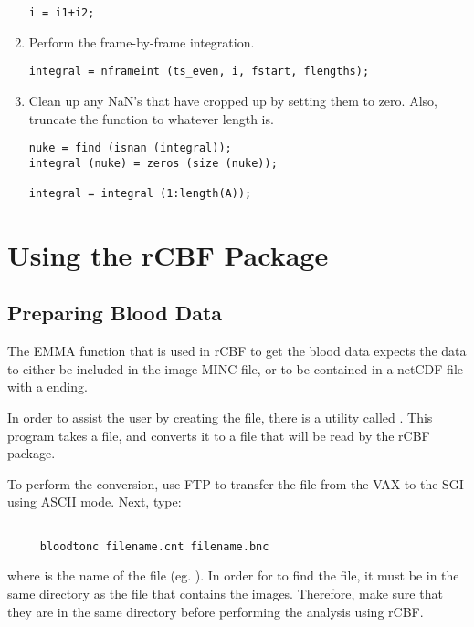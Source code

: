 \begin{enumerate}
\begin{verbatim}
i = i1+i2;
\end{verbatim}

\item Perform the frame-by-frame integration.
\begin{verbatim}
integral = nframeint (ts_even, i, fstart, flengths);
\end{verbatim}

\item Clean up any NaN's that have cropped up by setting them to zero.
Also, truncate the function to whatever length  is.
\begin{verbatim}
nuke = find (isnan (integral));
integral (nuke) = zeros (size (nuke));

integral = integral (1:length(A));
\end{verbatim}
\end{enumerate}


\newpage
\section{Using the rCBF Package}

\subsection{Preparing Blood Data}

The EMMA function  that is used in rCBF to get
the blood data expects the data to either be included in the image
MINC file, or to be contained in a netCDF file with a 
ending.

In order to assist the user by creating the  file, there
is a utility called .  This program takes a
 file, and converts it to a  file that will be
read by the rCBF package.

To perform the conversion, use FTP to transfer the  file
from the VAX to the SGI using ASCII mode.  Next, type:

\begin{verbatim}

     bloodtonc filename.cnt filename.bnc

\end{verbatim}

where  is the name of the file (eg.
).  In order for  to find the
 file, it must be in the same directory as the 
file that contains the images.  Therefore, make sure that they are in
the same directory before performing the analysis using rCBF.


